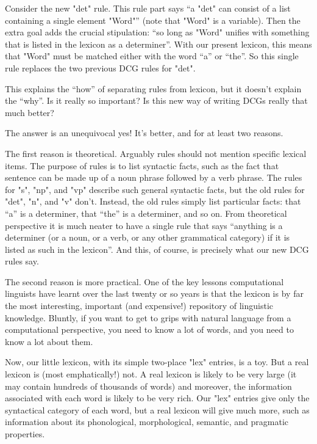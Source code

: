 Consider the new "det" rule. This rule part says ``a "det"
can consist of a list containing a single element "Word"'' (note
that "Word" is a variable). Then the extra goal adds the crucial
stipulation: ``so long as "Word" unifies  with something that is
listed in the lexicon as a determiner''.  With our present lexicon,
this means that "Word" must be matched either with the word ``a''
or ``the''.  So this single rule replaces the two previous DCG rules
for "det".

This explains the ``how'' of separating rules from lexicon, but it
doesn't explain the ``why''. Is it really so important? Is this new
way of writing DCGs really that much better?

The answer is an unequivocal yes! It's  better, and for
at least two reasons.

The first reason is theoretical. Arguably rules should not mention
specific lexical items. The purpose of rules is to list
 syntactic facts, such as the fact that sentence can
be made up of a noun phrase followed by a verb phrase. The rules for
"s", "np", and "vp" describe such general syntactic facts, but the old
rules for "det", "n", and "v" don't. Instead, the old rules simply
list particular facts: that ``a'' is a determiner, that ``the'' is a
determiner, and so on.  From theoretical perspective it is much neater
to have a single rule that says ``anything is a determiner (or a noun,
or a verb, or any other grammatical category) if it is listed as such
in the lexicon''. And this, of course, is precisely what our new DCG
rules say.

The second reason is more practical. One of the key lessons
computational linguists have learnt over the last twenty or so years
is that the lexicon is by far the most interesting, important (and
expensive!) repository of linguistic knowledge. Bluntly, if you want
to get to grips with natural language from a computational perspective,
you need to know a lot of words, and you need to know a lot about them.

 Now, our little lexicon, with its simple two-place "lex" entries, is
a toy. But a real lexicon is (most emphatically!) not. A real lexicon
is likely to be very large (it may contain hundreds of thousands of
words) and moreover, the information associated with each word is
likely to be very rich.  Our "lex" entries give only the syntactical
category of each word, but a real lexicon will give much more, such as
information about its phonological, morphological, semantic, and
pragmatic properties.

